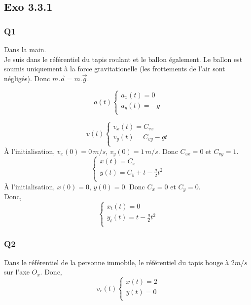 \documentclass[]{book}
\theoremstyle{definition}
\begin{document}
\subsection*{Exo 3.3.1}
\subsubsection*{Q1}
Dans la main.\\

Je suis dans le r\'ef\'erentiel du tapis roulant et le ballon \'egalement. Le ballon est soumis uniquement \`a la force gravitationelle (les frottements de l'air sont n\'eglig\'es). Donc $m.\overrightarrow{a} = m.\overrightarrow{g}$.

$$a(t)
\left\{
\begin{array}{l}
 a_{x}(t) = 0 \\
 a_{y}(t) = -g \\
\end{array}
\right. 
$$

$$v(t)
\left\{
\begin{array}{l}
 v_{x}(t) =  C_{vx} \\
 v_{y}(t) =  C_{vy} -gt \\
\end{array}
\right. 
$$
\`A l'initialisation, $v_{x}(0) = 0\, m/s$, $v_{y}(0) = 1\, m/s$. Donc $C_{vx} = 0$ et $C_{vy} = 1$.\\

$$
\left\{
\begin{array}{l}
 x(t) =  C_{x} \\
 y(t) =  C_{y} + t -\frac{g}{2}t^2 \\
\end{array}
\right. 
$$
\`A l'initialisation, $x(0) = 0$, $y(0) = 0$. Donc $C_{x} = 0$ et $C_{y} = 0$.\\

Donc,
$$
\left\{
\begin{array}{l}
 x_t(t) =  0 \\
 y_t(t) =  t -\frac{g}{2}t^2 \\
\end{array}
\right. 
$$


\subsubsection*{Q2}
Dans le r\'ef\'erentiel de la personne immobile, le r\'ef\'erentiel du tapis bouge \`a $2m/s$ sur l'axe $O_x$. Donc, 
$$v_{r}(t)
\left\{
\begin{array}{l}
 x(t) =  2 \\
 y(t) =  0 \\
\end{array}
\right. 
$$
\end{document}
